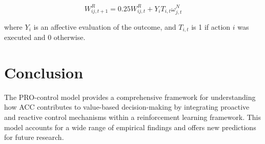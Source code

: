 \begin{equation}
W^R_{ij,t+1} = 0.25 W^R_{ij,t} + Y_i T_{i,t} \omega^N_{j,t}
\end{equation}

where $Y_i$ is an affective evaluation of the outcome, and $T_{i,t}$ is 1 if action $i$ was executed and 0 otherwise.

\section{Conclusion}

The PRO-control model provides a comprehensive framework for understanding how ACC contributes to value-based decision-making by integrating proactive and reactive control mechanisms within a reinforcement learning framework.  This model accounts for a wide range of empirical findings and offers new predictions for future research.

